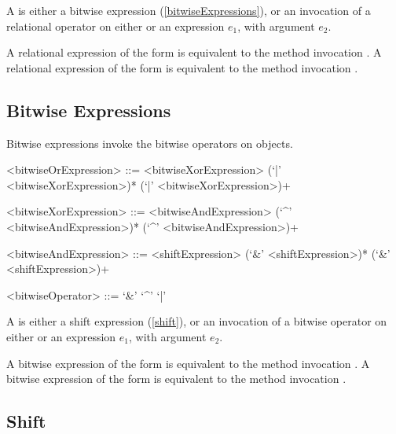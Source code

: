 \documentclass[makeidx]{article}
\begin{document}
{\LMHash{}%
A  is either a bitwise expression
(\ref{bitwiseExpressions}),
or an invocation of a relational operator on either \SUPER{}
or an expression $e_1$, with argument $e_2$.

\LMHash{}%
A relational expression of the form 
is equivalent to the method invocation .
A relational expression of the form 
is equivalent to the method invocation .


\subsection{Bitwise Expressions}

\LMHash{}%
Bitwise expressions invoke the bitwise operators on objects.

\begin{grammar}
<bitwiseOrExpression> ::= \gnewline{}
  <bitwiseXorExpression> (`|' <bitwiseXorExpression>)*
  \alt \SUPER{} (`|' <bitwiseXorExpression>)+

<bitwiseXorExpression> ::= \gnewline{}
  <bitwiseAndExpression> (`^' <bitwiseAndExpression>)*
  \alt \SUPER{} (`^' <bitwiseAndExpression>)+

<bitwiseAndExpression> ::= <shiftExpression> (`\&' <shiftExpression>)*
  \alt \SUPER{} (`\&' <shiftExpression>)+

<bitwiseOperator> ::= `\&'
  \alt `^'
  \alt `|'
\end{grammar}

\LMHash{}%
A  is either a shift expression (\ref{shift}),
or an invocation of a bitwise operator
on either \SUPER{} or an expression $e_1$,
with argument $e_2$.

\LMHash{}%
A bitwise expression of the form 
is equivalent to the method invocation .
A bitwise expression of the form 
is equivalent to the method invocation .



\subsection{Shift}

}
\end{document}
